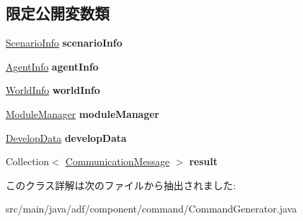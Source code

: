 \subsection*{限定公開変数類}
\begin{DoxyCompactItemize}
\item 
\hypertarget{classadf_1_1component_1_1command_1_1CommandGenerator_a543633658836fd35a1a84863a6590db1}{}\label{classadf_1_1component_1_1command_1_1CommandGenerator_a543633658836fd35a1a84863a6590db1} 
\hyperlink{classadf_1_1agent_1_1info_1_1ScenarioInfo}{Scenario\+Info} {\bfseries scenario\+Info}
\item 
\hypertarget{classadf_1_1component_1_1command_1_1CommandGenerator_a8d7f44b456637032255eacd51e8cfc27}{}\label{classadf_1_1component_1_1command_1_1CommandGenerator_a8d7f44b456637032255eacd51e8cfc27} 
\hyperlink{classadf_1_1agent_1_1info_1_1AgentInfo}{Agent\+Info} {\bfseries agent\+Info}
\item 
\hypertarget{classadf_1_1component_1_1command_1_1CommandGenerator_ac0f8b8c16c071a23223d7485cd188c97}{}\label{classadf_1_1component_1_1command_1_1CommandGenerator_ac0f8b8c16c071a23223d7485cd188c97} 
\hyperlink{classadf_1_1agent_1_1info_1_1WorldInfo}{World\+Info} {\bfseries world\+Info}
\item 
\hypertarget{classadf_1_1component_1_1command_1_1CommandGenerator_ab10faeffe7d6547cf5d27726c64a699d}{}\label{classadf_1_1component_1_1command_1_1CommandGenerator_ab10faeffe7d6547cf5d27726c64a699d} 
\hyperlink{classadf_1_1agent_1_1module_1_1ModuleManager}{Module\+Manager} {\bfseries module\+Manager}
\item 
\hypertarget{classadf_1_1component_1_1command_1_1CommandGenerator_adce137b57368269f73e5259b0f844279}{}\label{classadf_1_1component_1_1command_1_1CommandGenerator_adce137b57368269f73e5259b0f844279} 
\hyperlink{classadf_1_1agent_1_1develop_1_1DevelopData}{Develop\+Data} {\bfseries develop\+Data}
\item 
\hypertarget{classadf_1_1component_1_1command_1_1CommandGenerator_a60302b470fa7607d888d5545ea17d311}{}\label{classadf_1_1component_1_1command_1_1CommandGenerator_a60302b470fa7607d888d5545ea17d311} 
Collection$<$ \hyperlink{classadf_1_1component_1_1communication_1_1CommunicationMessage}{Communication\+Message} $>$ {\bfseries result}
\end{DoxyCompactItemize}


このクラス詳解は次のファイルから抽出されました\+:\begin{DoxyCompactItemize}
\item 
src/main/java/adf/component/command/Command\+Generator.\+java\end{DoxyCompactItemize}
